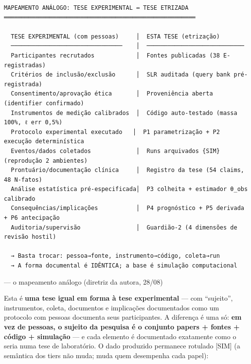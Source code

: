 \documentclass[
  12pt,
]{report}
\begin{document}
\begin{verbatim}
MAPEAMENTO ANÁLOGO: TESE EXPERIMENTAL ↔ TESE ETRIZADA
═══════════════════════════════════════════════════════

  TESE EXPERIMENTAL (com pessoas)     │  ESTA TESE (etrização)
  ────────────────────────────────    │  ────────────────────────────
  Participantes recrutados            │  Fontes publicadas (38 E-registradas)
  Critérios de inclusão/exclusão      │  SLR auditada (query bank pré-registrada)
  Consentimento/aprovação ética       │  Proveniência aberta (identifier confirmado)
  Instrumentos de medição calibrados  │  Código auto-testado (massa 100%, ℓ err 0,5%)
  Protocolo experimental executado   │  P1 parametrização + P2 execução determinística
  Eventos/dados coletados             │  Runs arquivados {SIM} (reprodução 2 ambientes)
  Prontuário/documentação clínica     │  Registro da tese (54 claims, 48 N-fatos)
  Análise estatística pré-especificada│  P3 colheita + estimador θ_obs calibrado
  Consequências/implicações           │  P4 prognóstico + P5 derivada + P6 antecipação
  Auditoria/supervisão                │  Guardião-2 (4 dimensões de revisão hostil)

  → Basta trocar: pessoa→fonte, instrumento→código, coleta→run
  → A forma documental é IDÊNTICA; a base é simulação computacional
\end{verbatim}

--- o mapeamento análogo (diretriz da autora, 28/08)

Esta é \textbf{uma tese igual em forma à tese experimental} --- com
``sujeito'', instrumentos, coleta, documentos e implicações documentados
como um protocolo com pessoas documenta seus participantes. A diferença
é uma só: \textbf{em vez de pessoas, o sujeito da pesquisa é o conjunto
papers + fontes + código + simulação} --- e cada elemento é documentado
exatamente como o seria numa tese de laboratório. O dado produzido
permanece rotulado {[}SIM{]} (a semântica dos tiers não muda; muda quem
desempenha cada papel):
\end{document}
